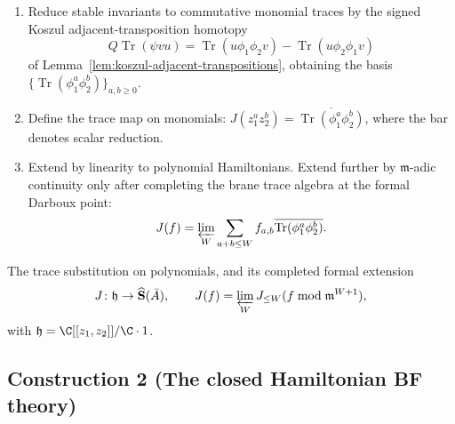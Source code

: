 \begin{description}
\begin{enumerate}
stable limit after the Procesi--Razmyslov range.
\item Reduce stable invariants to commutative monomial traces by the
signed Koszul adjacent-transposition homotopy
\[
  Q\operatorname{Tr}(\psi vu)=
  \operatorname{Tr}(u\phi_1\phi_2v)-
  \operatorname{Tr}(u\phi_2\phi_1v)
\]
of Lemma~\ref{lem:koszul-adjacent-transpositions}, obtaining the basis
\(\{\operatorname{Tr}(\phi_1^a\phi_2^b)\}_{a,b\ge 0}\).
\item Define the trace map on monomials:
\(J(z_1^az_2^b)=\overline{\operatorname{Tr}(\phi_1^a\phi_2^b)}\),
where the bar denotes scalar reduction.
\item Extend by linearity to polynomial Hamiltonians.  Extend further
by \(\mathfrak m\)-adic continuity only after completing the brane
trace algebra at the formal Darboux point:
\[
  J(f)=\varprojlim_W
  \sum_{a+b\leq W}f_{a,b}
  \overline{\operatorname{Tr}(\phi_1^a\phi_2^b)} .
\]
\end{enumerate}
\item[Result.]  The trace substitution on polynomials, and its
completed formal extension
\[
  J\colon\mathfrak h\to\widehat{\mathbf S}(\bar A),\qquad
  J(f)=\varprojlim_WJ_{\leq W}(f\bmod\mathfrak m^{W+1}),
\]
with \(\mathfrak h=\C[[z_1,z_2]]/\C\cdot 1\).
\end{description}

\subsection*{Construction 2 (The closed Hamiltonian BF theory)}\label{algo:closed-BV}

